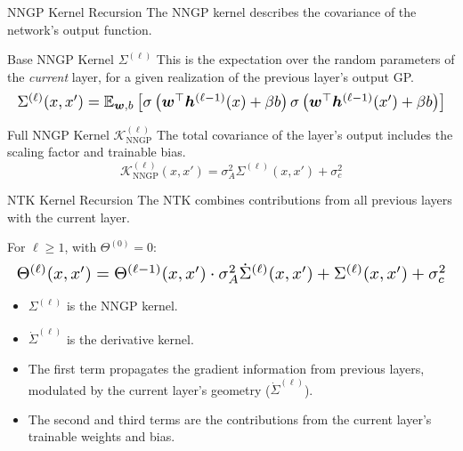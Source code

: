 \documentclass{beamer}
\begin{document}
\begin{frame}{NNGP Kernel Recursion}
The NNGP kernel describes the covariance of the network's output function.
\begin{block}{Base NNGP Kernel $\Sigma^{(\ell)}$}
This is the expectation over the random parameters of the \textit{current} layer, for a given realization of the previous layer's output GP.
\begin{equation*}
\resizebox{\hsize}{!}{$
\Sigma^{(\ell)}(x, x') = \mathbb{E}_{\bm{w}, b} \left[ \sigma\left(\bm{w}^\top \bm{h}^{(\ell-1)}(x) + \beta b\right) \sigma\left(\bm{w}^\top \bm{h}^{(\ell-1)}(x') + \beta b\right) \right]
$}
\end{equation*}
\end{block}
\begin{block}{Full NNGP Kernel $\mathcal{K}_{\text{NNGP}}^{(\ell)}$}
The total covariance of the layer's output includes the scaling factor and trainable bias.
\begin{equation*}
    \mathcal{K}_{\text{NNGP}}^{(\ell)}(x, x') = \sigma_A^2 \Sigma^{(\ell)}(x, x') + \sigma_c^2
\end{equation*}
\end{block}
\end{frame}

\begin{frame}{NTK Kernel Recursion}
The NTK combines contributions from all previous layers with the current layer.
\begin{theorem}
For $\ell \ge 1$, with $\Theta^{(0)}=0$:
\begin{equation*}
\resizebox{\hsize}{!}{$
\Theta^{(\ell)}(x, x') = \Theta^{(\ell-1)}(x, x') \cdot \sigma_A^2\dot{\Sigma}^{(\ell)}(x, x') +  \Sigma^{(\ell)}(x, x') + \sigma_c^2
$}
\end{equation*}
\end{theorem}
\begin{itemize}
    \item $\Sigma^{(\ell)}$ is the NNGP kernel.
    \item $\dot{\Sigma}^{(\ell)}$ is the derivative kernel.
    \item The first term propagates the gradient information from previous layers, modulated by the current layer's geometry ($\dot{\Sigma}^{(\ell)}$).
    \item The second and third terms are the contributions from the current layer's trainable weights and bias.
\end{itemize}
\end{frame}
\end{document}
